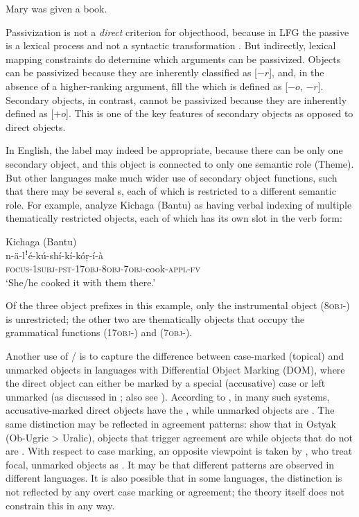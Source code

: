 \documentclass[output=paper]{../langscibook}
\begin{document}
 \ea\label{ex:gfs:english-indirect-passive}
  \ea
  Mary was given a book.
  
  \z
 \z
 
 \hspace*{-.6pt}Passivization is not a \textit{direct} criterion for objecthood, because in LFG the passive is a lexical process and not a syntactic transformation \citep[28]{DLM:LFG}. But indirectly, lexical mapping constraints do determine which arguments can be passivized. Objects can be passivized because they are inherently classified as [$-r$], and, in the absence of a higher-ranking argument, fill the \SUBJ \GF which is defined as [$-{o}$, $-r$]. Secondary objects, in contrast, cannot be passivized because they are inherently defined as [$+{o}$]. This is one of the key features of secondary objects as opposed to direct objects.
  
 In English, the label {} may indeed be appropriate, because there can be only one secondary object, and this object is connected to only one semantic role (Theme). But other languages make much wider use of secondary object functions, such that there may be several {\OBJTHETA}s, each of which is restricted to a different semantic role. For example, \citet{BresMosh90} analyze Kichaga (Bantu) as having verbal indexing of multiple thematically restricted objects, each of which has its own slot in the verb form:
 
 \ea
 Kichaga (Bantu)\\
 \gll n-ä-lꜝé-kú-shí-kí-kóṛ-í-à\\
 \textsc{focus-1subj-pst-17obj-8obj-7obj-}cook\textsc{-appl-fv}\\
 \trans `She/he cooked it with them there.' \citep[151]{BresMosh90}
 \z
 
\noindent Of the three object prefixes in this example, only the instrumental object (\textsc{8obj-}) is unrestricted; the other two are thematically objects that occupy the grammatical functions {} (\textsc{17obj-}) and {} (\textsc{7obj-}).
 
Another use of {} / {\OBJTHETA} is to capture the difference between case-marked (topical) and unmarked objects in languages with Differential Object Marking (DOM), where the direct object can either be marked by a special (accusative) case or left unmarked (as discussed in ; also see ). According to \citet{DN}, in many such systems, accusative-marked direct objects have the \GF \OBJ, while unmarked objects are {\OBJTHETA}. The same distinction may be reflected in agreement patterns: \citet{DN} show that in Ostyak (Ob-Ugric > Uralic), objects that trigger agreement are \OBJ while objects that do not are {\OBJTHETA}. With respect to case marking, an opposite viewpoint is taken by \citet{BK96}, who treat focal, unmarked objects as \OBJ. It may be that different patterns are observed in different languages. It is also possible that in some languages, the distinction is not reflected by any overt case marking or agreement; the theory itself does not constrain this in any way.
\end{document}
